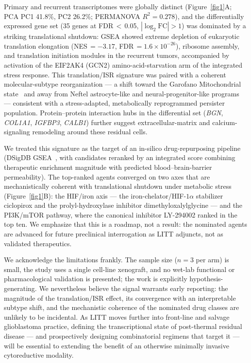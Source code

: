 \documentclass[unnumsec,webpdf,contemporary,large]{oup-authoring-template}
\begin{document}
Primary and recurrent transcriptomes were globally distinct (Figure~\ref{fig1}A; PCA PC1 41.8\%, PC2 26.2\%; PERMANOVA $R^{2}=0.278$), and the differentially expressed gene set (35 genes at FDR\,$<$\,0.05, $|\log_{2}\mathrm{FC}|>1$) was dominated by a striking translational shutdown: GSEA showed extreme depletion of eukaryotic translation elongation (NES\,$=-3.17$, FDR\,$=1.6\times10^{-26}$), ribosome assembly, and translation initiation modules in the recurrent tumors, accompanied by activation of the EIF2AK4 (GCN2) amino-acid-starvation arm of the integrated stress response. This translation/ISR signature was paired with a coherent molecular-subtype reorganization --- a shift toward the Garofano Mitochondrial state~\cite{Garofano} and away from Neftel astrocyte-like and neural-progenitor-like programs~\cite{Neftel} --- consistent with a stress-adapted, metabolically reprogrammed persister population. Protein--protein interaction hubs in the differential set (\textit{BGN}, \textit{COL1A1}, \textit{IGFBP3}, \textit{CALB1}) further suggest extracellular-matrix and calcium-signaling remodeling around these residual cells.

We treated this signature as the target of an in-silico drug-repurposing pipeline (DSigDB GSEA~\cite{DSigDB}, with candidates reranked by an integrated score combining therapeutic enrichment magnitude with predicted blood--brain-barrier permeability). The top-ranked agents converged on two axes that are mechanistically coherent with translational shutdown under metabolic stress (Figure~\ref{fig1}B): the HIF/iron axis --- the iron-chelator/HIF-$1\alpha$ stabilizer ciclopirox and the prolyl-hydroxylase inhibitor dimethyloxalylglycine --- and the PI3K/mTOR pathway, where the canonical inhibitor LY-294002 ranked in the top ten. We emphasize that this is a roadmap, not a result: the nominated agents are advanced for future preclinical interrogation as LITT adjuncts, not as validated therapeutics.

We acknowledge the limitations frankly. The sample size ($n=3$ per arm) is small, the study uses a single cell-line xenograft, and no wet-lab functional or pharmacological validation is presented; the work is explicitly hypothesis-generating. We nevertheless believe the signal warrants early reporting: the magnitude of the translation/ISR effect, its convergence with an interpretable subtype shift, and the mechanistic coherence of the nominated drug classes are unlikely to be incidental. As LITT moves further into front-line and salvage glioblastoma practice, defining the transcriptional state of post-thermal residual disease --- and prospectively designing combinatorial regimens that target it --- will be essential to extending the benefit of an otherwise minimally invasive cytoreductive modality.
\end{document}
